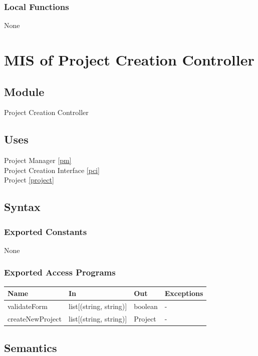 \documentclass[12pt, titlepage]{article}
\begin{document}
\subsubsection{Local Functions}
None

\section{MIS of Project Creation Controller} \label{pcc}

\subsection{Module}

Project Creation Controller

\subsection{Uses}

Project Manager \ref{pm}\\
Project Creation Interface \ref{pci}\\
Project \ref{project} \\

\subsection{Syntax}

\subsubsection{Exported Constants}
None
\subsubsection{Exported Access Programs}

\begin{center}
\begin{tabular}{p{4cm} p{4cm} p{4cm} p{2cm}}
\hline
\textbf{Name} & \textbf{In} & \textbf{Out} & \textbf{Exceptions} \\
\hline
validateForm & list[(string, string)] & boolean & - \\
createNewProject & list[(string, string)] & Project & - \\
\hline
\end{tabular}
\end{center}

\subsection{Semantics}
\end{document}
